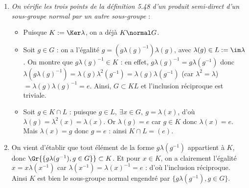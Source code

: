 

\begin{enumerate}
 \item \emph{On vérifie les trois points de la définition 5.48 d'un produit semi-direct d'un sous-groupe normal par un autre sous-groupe} :
 \begin{itemize}
  \item Puisque $K:= \Ker \lambda$, on a déjà $K\normal G$.
  \item Soit $g\in G$ : on a l'égalité $g = \left(g\lambda(g)^{-1}\right)\lambda(g)$, avec $\lambda(g) \in L:= \im \lambda$. On montre que $g\lambda(g)^{-1} \in K$ : en effet, $g\lambda(g)^{-1} = g\lambda(g^{-1})$ donc $\lambda\left(g\lambda(g)^{-1}\right) = \lambda(g)\lambda^2(g^{-1}) = \lambda(g)\lambda(g^{-1})$ (car $\lambda^2 = \lambda$) $=\lambda(g)\lambda(g)^{-1} = e$. Ainsi, $G\subset KL$ et l'inclusion réciproque est triviale.
  \item Soit $g\in K\cap L$ : puisque $g\in L,~ \exists x\in G,~ g = \lambda(x)$, d'où $\lambda(g) = \lambda^2(x) = \lambda(x)$. Or $\lambda(g) = e$ car $g\in K$ donc $\lambda(x) = e$. Mais $\lambda(x) = g$ donc $g=e$ : ainsi $K\cap L = (e)$.
 \end{itemize}

 \item On vient d'établir que tout élément de la forme $g\lambda(g^{-1})$ appartient à $K$, donc $\Gr{\{g\lambda(g^{-1}), g\in G\} } \subset K$. Et pour $x\in K$, on a clairement l'égalité $x = x\lambda(x^{-1})$ car $\lambda(x^{-1}) = \lambda(x)^{-1}=e$ : d'où l'inclusion réciproque. Ainsi $K$ est bien le sous-groupe normal engendré par $\{g\lambda(g^{-1}), g\in G\}$.



\end{enumerate}



